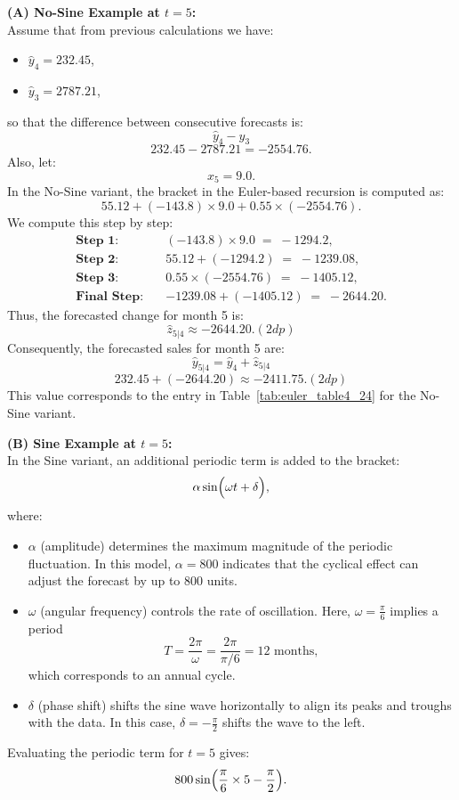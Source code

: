 \documentclass[10pt]{article}
\begin{document}
\textbf{(A) No-Sine Example at \(t=5\):}\\[2mm]
Assume that from previous calculations we have:
\begin{itemize}
    \item \(\hat{y}_4 = 232.45\),
    \item \(\hat{y}_3 = 2787.21\),
\end{itemize}
so that the difference between consecutive forecasts is:
\[
\hat{y}_4 - \hat{y}_3 \] \[232.45 - 2787.21 = -2554.76. 
\]
Also, let:
\[
x_5 = 9.0.
\]
In the No-Sine variant, the bracket in the Euler-based recursion is computed as:
\[
55.12 + (-143.8)\times 9.0 + 0.55\times (-2554.76).
\]
We compute this step by step:
\begin{align*}
\textbf{Step 1:} \quad & (-143.8) \times 9.0 \;=\; -1294.2, \\
\textbf{Step 2:} \quad & 55.12 + (-1294.2) \;=\; -1239.08, \\
\textbf{Step 3:} \quad & 0.55 \times (-2554.76) \;=\; -1405.12, \quad \\[1mm]
\textbf{Final Step:} \quad & -1239.08 + (-1405.12) \;=\; -2644.20. 
\end{align*}
Thus, the forecasted change for month 5 is:
\[
\hat{z}_{5|4} \approx -2644.20. (2dp)
\]
Consequently, the forecasted sales for month 5 are:
\[
\hat{y}_{5|4} = \hat{y}_4 + \hat{z}_{5|4} \]\[ 232.45 + (-2644.20) \approx -2411.75. (2dp)
\]
This value corresponds to the entry in Table~\ref{tab:euler_table4_24} for the No-Sine variant.

\bigskip

\textbf{(B) Sine Example at \(t=5\):}\\[2mm]
In the Sine variant, an additional periodic term is added to the bracket:
\[
\alpha\sin\Bigl(\omega t + \delta\Bigr),
\]
where:
\begin{itemize}
    \item \(\alpha\) (amplitude) determines the maximum magnitude of the periodic fluctuation. In this model, \(\alpha = 800\) indicates that the cyclical effect can adjust the forecast by up to 800 units.
    \item \(\omega\) (angular frequency) controls the rate of oscillation. Here, \(\omega = \frac{\pi}{6}\) implies a period 
    \[
    T = \frac{2\pi}{\omega} = \frac{2\pi}{\pi/6} = 12 \text{ months},
    \]
    which corresponds to an annual cycle.
    \item \(\delta\) (phase shift) shifts the sine wave horizontally to align its peaks and troughs with the data. In this case, \(\delta = -\frac{\pi}{2}\) shifts the wave to the left.
\end{itemize}
Evaluating the periodic term for \(t=5\) gives:
\[
800\sin\Bigl(\frac{\pi}{6}\times 5 - \frac{\pi}{2}\Bigr).
\]
\end{document}
